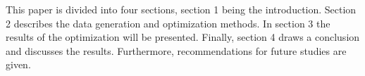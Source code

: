 This paper is divided into four sections, section 1 being the introduction. Section 2 describes the data generation and optimization methods. In section 3 the results of the optimization will be presented. Finally, section 4 draws a conclusion and discusses the results. Furthermore, recommendations for future studies are given.

